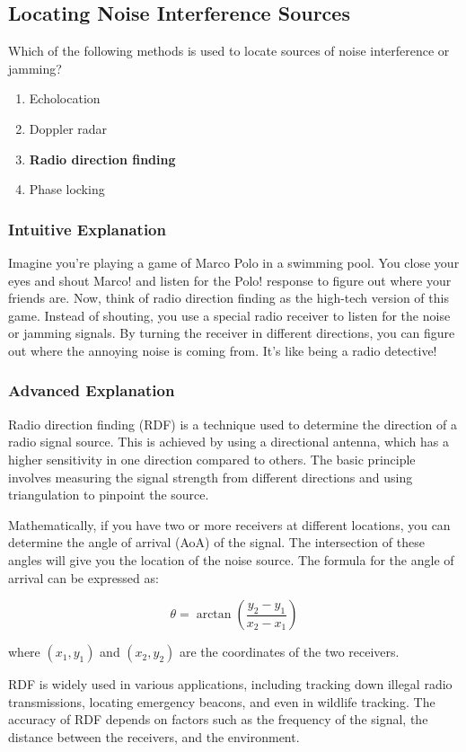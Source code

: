 \subsection{Locating Noise Interference Sources}\label{T8C01}

\begin{tcolorbox}[colback=gray!10!white,colframe=black!75!black,title=T8C01]
Which of the following methods is used to locate sources of noise interference or jamming?
\begin{enumerate}[label=\Alph*)]
    \item Echolocation
    \item Doppler radar
    \item \textbf{Radio direction finding}
    \item Phase locking
\end{enumerate}
\end{tcolorbox}

\subsubsection{Intuitive Explanation}
Imagine you're playing a game of Marco Polo in a swimming pool. You close your eyes and shout Marco! and listen for the Polo! response to figure out where your friends are. Now, think of radio direction finding as the high-tech version of this game. Instead of shouting, you use a special radio receiver to listen for the noise or jamming signals. By turning the receiver in different directions, you can figure out where the annoying noise is coming from. It's like being a radio detective!

\subsubsection{Advanced Explanation}
Radio direction finding (RDF) is a technique used to determine the direction of a radio signal source. This is achieved by using a directional antenna, which has a higher sensitivity in one direction compared to others. The basic principle involves measuring the signal strength from different directions and using triangulation to pinpoint the source.

Mathematically, if you have two or more receivers at different locations, you can determine the angle of arrival (AoA) of the signal. The intersection of these angles will give you the location of the noise source. The formula for the angle of arrival can be expressed as:

\[
\theta = \arctan\left(\frac{y_2 - y_1}{x_2 - x_1}\right)
\]

where \((x_1, y_1)\) and \((x_2, y_2)\) are the coordinates of the two receivers.

RDF is widely used in various applications, including tracking down illegal radio transmissions, locating emergency beacons, and even in wildlife tracking. The accuracy of RDF depends on factors such as the frequency of the signal, the distance between the receivers, and the environment.

